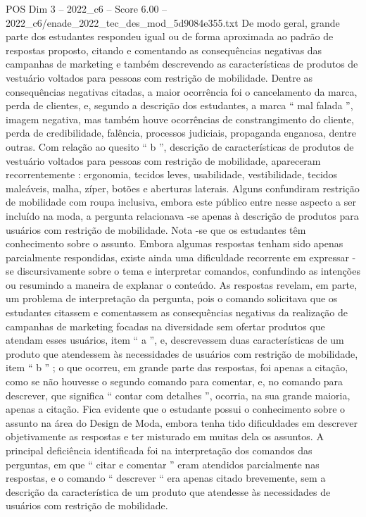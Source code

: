 \begin{textsample}{POS Dim 3 – 2022\_c6 – Score 6.00 – 2022\_c6/enade\_2022\_tec\_des\_mod\_5d9084e355.txt}
De modo geral, grande parte dos estudantes respondeu igual ou de forma aproximada ao padrão de respostas proposto, citando e comentando as consequências negativas das campanhas de marketing e também descrevendo as características de produtos de vestuário voltados para pessoas com restrição de mobilidade.
Dentre as consequências negativas citadas, a maior ocorrência foi o cancelamento da marca, perda de clientes, e, segundo a descrição dos estudantes, a marca “ mal falada ”, imagem negativa, mas também houve ocorrências de constrangimento do cliente, perda de credibilidade, falência, processos judiciais, propaganda enganosa, dentre outras.
Com relação ao quesito “ b ”, descrição de características de produtos de vestuário voltados para pessoas com restrição de mobilidade, apareceram recorrentemente : ergonomia, tecidos leves, usabilidade, vestibilidade, tecidos maleáveis, malha, zíper, botões e aberturas laterais.
Alguns confundiram restrição de mobilidade com roupa inclusiva, embora este público entre nesse aspecto a ser incluído na moda, a pergunta relacionava -se apenas à descrição de produtos para usuários com restrição de mobilidade.
Nota -se que os estudantes têm conhecimento sobre o assunto.
Embora algumas respostas tenham sido apenas parcialmente respondidas, existe ainda uma dificuldade recorrente em expressar -se discursivamente sobre o tema e interpretar comandos, confundindo as intenções ou resumindo a maneira de explanar o conteúdo.
As respostas revelam, em parte, um problema de interpretação da pergunta, pois o comando solicitava que os estudantes citassem e comentassem as consequências negativas da realização de campanhas de marketing focadas na diversidade sem ofertar produtos que atendam esses usuários, item “ a ”, e, descrevessem duas características de um produto que atendessem às necessidades de usuários com restrição de mobilidade, item “ b ” ; o que ocorreu, em grande parte das respostas, foi apenas a citação, como se não houvesse o segundo comando para comentar, e, no comando para descrever, que significa “ contar com detalhes ”, ocorria, na sua grande maioria, apenas a citação.
Fica evidente que o estudante possui o conhecimento sobre o assunto na área do Design de Moda, embora tenha tido dificuldades em descrever objetivamente as respostas e ter misturado em muitas dela os assuntos.
A principal deficiência identificada foi na interpretação dos comandos das perguntas, em que “ citar e comentar ” eram atendidos parcialmente nas respostas, e o comando “ descrever “ era apenas citado brevemente, sem a descrição da característica de um produto que atendesse às necessidades de usuários com restrição de mobilidade.

\end{textsample}

